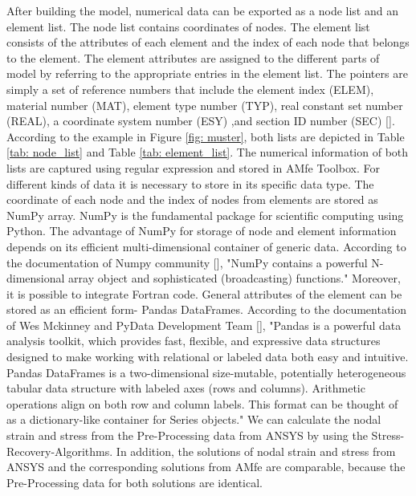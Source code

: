 After building the model, numerical data can be exported as a node list and an element list. The node list contains coordinates of nodes. The element list consists of the attributes of each element and the index of each node that belongs to the element. The element attributes are assigned to the different parts of model by referring to the appropriate entries in the element list. The pointers are simply a set of reference numbers that include  the element index (ELEM), material number (MAT), element type number (TYP), real constant set number (REAL), a coordinate system number (ESY) ,and section ID number (SEC) [\cite{ANSYS}]. According to the example in Figure \ref{fig: muster}, both lists are depicted in Table \ref{tab: node_list} and Table \ref{tab: element_list}. The numerical information of both lists are captured using regular expression and stored in AMfe Toolbox. For different kinds of data it is necessary to store in its specific data type. The coordinate of each node and the index of nodes from elements are stored as NumPy array. NumPy is the fundamental package for scientific computing using Python. The advantage of NumPy for storage of node and element information depends on its efficient multi-dimensional container of generic data. According to the documentation of Numpy community [\cite{Numpy}], "NumPy contains a powerful N-dimensional array object and sophisticated (broadcasting) functions." Moreover, it is possible to integrate Fortran code. General attributes of the element can be stored as an efficient form- Pandas DataFrames. According to the documentation of Wes Mckinney and PyData Development Team [\cite{Pandas}], "Pandas is a powerful data analysis toolkit, which provides fast, flexible, and expressive data structures designed to make working with relational or labeled data both easy and intuitive. Pandas DataFrames is a two-dimensional size-mutable, potentially heterogeneous tabular data structure with labeled axes (rows and columns). Arithmetic operations align on both row and column labels. This format can be thought of as a dictionary-like container for Series objects." We can calculate the nodal strain and stress from the Pre-Processing data from ANSYS by using the Stress-Recovery-Algorithms. In addition, the solutions of nodal strain and stress from ANSYS and the corresponding solutions from AMfe are comparable, because the Pre-Processing data for both solutions are identical.


